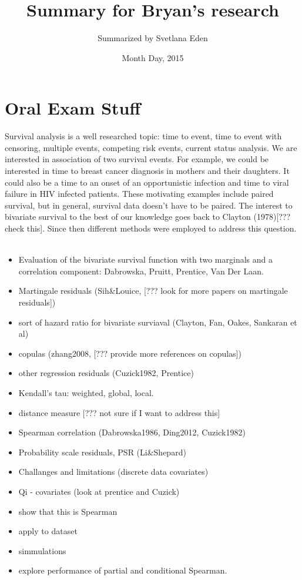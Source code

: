 \documentclass[]{article}
\title{Summary for Bryan's research}
\author{Summarized by Svetlana Eden}
\date{Month Day, 2015}
\begin{document}
\maketitle
\tableofcontents
\listoffigures
\listoftables
\clearpage

\section{Oral Exam Stuff}
Survival analysis is a well researched topic: time to event, time to event with censoring, multiple events, competing risk events, current status analysis. We are interested in association of two survival events. For example, we could be interested in time to breast cancer diagnosis in mothers and their daughters. It could also be a time to an onset of an opportunistic infection and time to viral failure in HIV infected patients. These motivating examples include paired survival, but in general, survival data doesn't have to be paired. The interest to bivariate survival to the best of our knowledge goes back to Clayton (1978)[??? check this]. Since then different methods were employed to address this question.\\
~\\
\begin{itemize}
	\item Evaluation of the bivariate survival function with two marginals and a correlation component:
	Dabrowska, Pruitt, Prentice, Van Der Laan.
	\item Martingale residuals (Sih\&Louice, [??? look for more papers on martingale residuals])
	\item sort of hazard ratio for bivariate surviaval (Clayton, Fan, Oakes, Sankaran et al)
	\item copulas (zhang2008, [??? provide more references on copulas])
	\item other regression residuals (Cuzick1982, Prentice)
	\item Kendall's tau: weighted, global, local. 
	\item distance measure [??? not sure if I want to address this]
	\item Spearman correlation (Dabrowska1986, Ding2012, Cuzick1982)
	\item Probability scale residuals, PSR (Li\&Shepard)
	\item Challanges and limitations (discrete data covariates)
	\item Qi - covariates (look at prentice and Cuzick)
	\item show that this is Spearman
	\item apply to dataset
	\item simmulations
	\item explore performance of partial and conditional Spearman.
\end{itemize}
\end{document}
